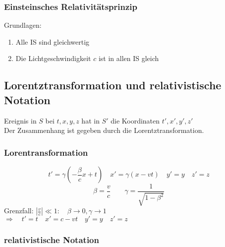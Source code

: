 \subsubsection{Einsteinsches Relativitätsprinzip}

Grundlagen:
\begin{enumerate}[1)]
	\item Alle IS sind gleichwertig
	\item Die Lichtgeschwindigkeit $ c $ ist in allen IS gleich
\end{enumerate}

\subsection{Lorentztransformation und relativistische Notation}

%
%
%
%
%
%
Ereignis in $ S $ bei $ t, x, y, z $ hat in $ S' $ die Koordinaten $ t', x', y', z' $\\
Der Zusammenhang ist gegeben durch die Lorentztransformation.

\subsubsection{Lorentransformation}

\begin{equation*}
t' = \gamma \left( - \frac{\beta}{c} x + t\right) \quad x' = \gamma \left(x - vt\right) \quad y' = y \quad z' = z
\end{equation*}
\begin{equation*}
\beta = \frac{v}{c} \qquad \gamma = \frac{1}{\sqrt{1 - \beta^2}}
\end{equation*}
Grenzfall: $ \left| \frac{v}{c} \right| \ll 1 : \quad \beta \to 0 , \gamma \to 1 $\\
$ \Rightarrow \quad t' = t \quad x' = c - vt \quad y' = y \quad z' = z $

\subsubsection{relativistische Notation}

